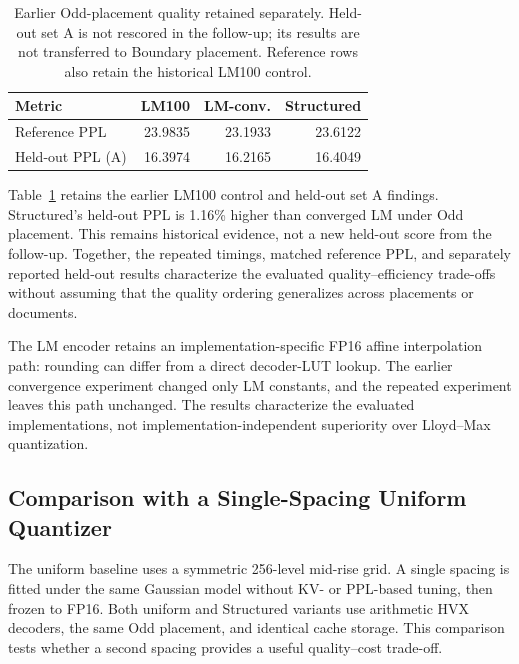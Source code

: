 \documentclass[conference,a4paper,10pt]{IEEEtran}
\begin{document}
\begin{table}[t]
\caption{Earlier Odd-placement quality retained separately. Held-out set A is not rescored in the follow-up; its results are not transferred to Boundary placement. Reference rows also retain the historical LM100 control.}
\label{tab:lm}
\centering
\setlength{\tabcolsep}{3.5pt}
\begin{tabular}{@{}lrrr@{}}
\toprule
Metric & LM100 & LM-conv. & Structured\\
\midrule
Reference PPL & 23.9835 & 23.1933 & 23.6122\\
Held-out PPL (A) & 16.3974 & 16.2165 & 16.4049\\
\bottomrule
\end{tabular}
\end{table}

Table~\ref{tab:lm} retains the earlier LM100 control and held-out set A findings. Structured's held-out PPL is 1.16\% higher than converged LM under Odd placement. This remains historical evidence, not a new held-out score from the follow-up. Together, the repeated timings, matched reference PPL, and separately reported held-out results characterize the evaluated quality--efficiency trade-offs without assuming that the quality ordering generalizes across placements or documents.

The LM encoder retains an implementation-specific FP16 affine interpolation path: rounding can differ from a direct decoder-LUT lookup. The earlier convergence experiment changed only LM constants, and the repeated experiment leaves this path unchanged. The results characterize the evaluated implementations, not implementation-independent superiority over Lloyd--Max quantization.

\subsection{Comparison with a Single-Spacing Uniform Quantizer}
The uniform baseline uses a symmetric 256-level mid-rise grid. A single spacing is fitted under the same Gaussian model without KV- or PPL-based tuning, then frozen to FP16. Both uniform and Structured variants use arithmetic HVX decoders, the same Odd placement, and identical cache storage. This comparison tests whether a second spacing provides a useful quality--cost trade-off.
\end{document}
